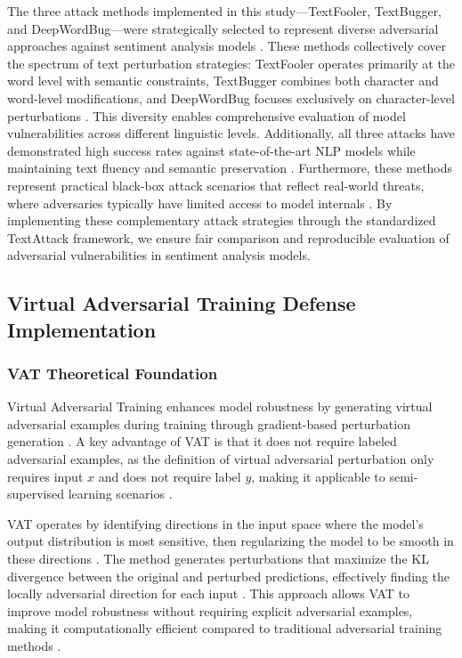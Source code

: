 \documentclass[../main.tex]{subfiles}
\begin{document}
The three attack methods implemented in this study—TextFooler, TextBugger, and DeepWordBug—were strategically selected to represent diverse adversarial approaches against sentiment analysis models \cite{jin2019textfooler}\cite{li2018textbugger}\cite{gao2018deepwordbug}. These methods collectively cover the spectrum of text perturbation strategies: TextFooler operates primarily at the word level with semantic constraints, TextBugger combines both character and word-level modifications, and DeepWordBug focuses exclusively on character-level perturbations \cite{morris2020textattack}. This diversity enables comprehensive evaluation of model vulnerabilities across different linguistic levels. Additionally, all three attacks have demonstrated high success rates against state-of-the-art NLP models while maintaining text fluency and semantic preservation \cite{jin2019textfooler}\cite{li2018textbugger}. Furthermore, these methods represent practical black-box attack scenarios that reflect real-world threats, where adversaries typically have limited access to model internals \cite{morris2020textattack}\cite{gao2018deepwordbug}. By implementing these complementary attack strategies through the standardized TextAttack framework, we ensure fair comparison and reproducible evaluation of adversarial vulnerabilities in sentiment analysis models.


\subsection{Virtual Adversarial Training Defense Implementation}

\subsubsection{VAT Theoretical Foundation}

Virtual Adversarial Training enhances model robustness by generating virtual adversarial examples during training through gradient-based perturbation generation \cite{miyato2017virtual}. A key advantage of VAT is that it does not require labeled adversarial examples, as the definition of virtual adversarial perturbation only requires input $x$ and does not require label $y$, making it applicable to semi-supervised learning scenarios \cite{miyato2017virtual}.

VAT operates by identifying directions in the input space where the model's output distribution is most sensitive, then regularizing the model to be smooth in these directions \cite{miyato2017virtual}. The method generates perturbations that maximize the KL divergence between the original and perturbed predictions, effectively finding the locally adversarial direction for each input \cite{miyato2017virtual}. This approach allows VAT to improve model robustness without requiring explicit adversarial examples, making it computationally efficient compared to traditional adversarial training methods \cite{miyato2017virtual}.
\end{document}
